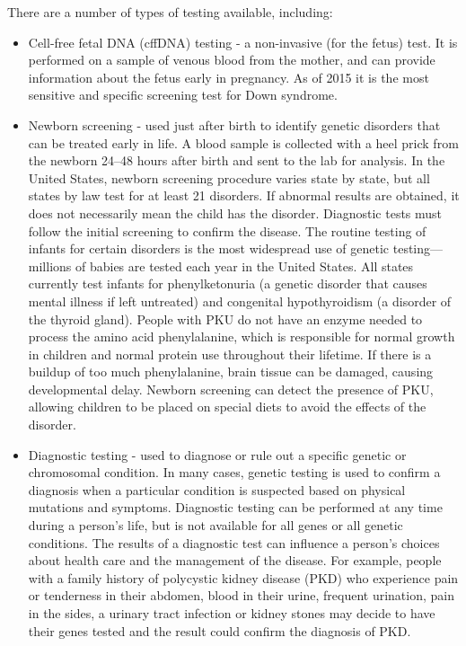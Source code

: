 There are a number of types of testing available, including:

\begin{itemize}
\tightlist
\item
  Cell-free fetal DNA (cffDNA) testing - a non-invasive (for the fetus) test. It is performed on a sample of venous blood from the mother, and can provide information about the fetus early in pregnancy. As of 2015 it is the most sensitive and specific screening test for Down syndrome.
\item
  Newborn screening - used just after birth to identify genetic disorders that can be treated early in life. A blood sample is collected with a heel prick from the newborn 24--48 hours after birth and sent to the lab for analysis. In the United States, newborn screening procedure varies state by state, but all states by law test for at least 21 disorders. If abnormal results are obtained, it does not necessarily mean the child has the disorder. Diagnostic tests must follow the initial screening to confirm the disease. The routine testing of infants for certain disorders is the most widespread use of genetic testing---millions of babies are tested each year in the United States. All states currently test infants for phenylketonuria (a genetic disorder that causes mental illness if left untreated) and congenital hypothyroidism (a disorder of the thyroid gland). People with PKU do not have an enzyme needed to process the amino acid phenylalanine, which is responsible for normal growth in children and normal protein use throughout their lifetime. If there is a buildup of too much phenylalanine, brain tissue can be damaged, causing developmental delay. Newborn screening can detect the presence of PKU, allowing children to be placed on special diets to avoid the effects of the disorder.
\item
  Diagnostic testing - used to diagnose or rule out a specific genetic or chromosomal condition. In many cases, genetic testing is used to confirm a diagnosis when a particular condition is suspected based on physical mutations and symptoms. Diagnostic testing can be performed at any time during a person's life, but is not available for all genes or all genetic conditions. The results of a diagnostic test can influence a person's choices about health care and the management of the disease. For example, people with a family history of polycystic kidney disease (PKD) who experience pain or tenderness in their abdomen, blood in their urine, frequent urination, pain in the sides, a urinary tract infection or kidney stones may decide to have their genes tested and the result could confirm the diagnosis of PKD.

\end{itemize}
